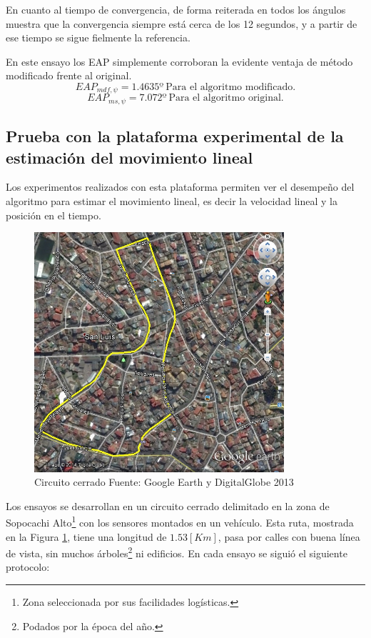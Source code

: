 \documentclass[conference]{IEEEtran}
\begin{document}
En cuanto al tiempo de convergencia, de forma reiterada en todos los ángulos muestra que la convergencia siempre está cerca de los 12 segundos, y a partir de ese tiempo se sigue fielmente la referencia.\par
En este ensayo los EAP simplemente corroboran la evidente ventaja de método modificado frente al original.
\begin{equation*}
EAP_{mdf,\psi}=1.4635º~\text{Para el algoritmo modificado.}
\end{equation*}
\begin{equation*}
EAP_{ms,\psi}=7.072º~\text{Para el algoritmo original.}
\end{equation*}\newpage
\subsection{Prueba con la plataforma experimental de la estimación del movimiento lineal}
Los experimentos realizados con esta plataforma permiten ver el desempeño del algoritmo para estimar el movimiento lineal, es decir la velocidad lineal y la posición en el tiempo. \par
\begin{figure}[ht]
\begin{center}
\includegraphics[width=25em]
{pruebas_fig1a.jpg}
\caption{Circuito cerrado \scriptsize{Fuente: Google Earth y DigitalGlobe 2013}}
\label{pruebas_fig1}
\end{center}
\end{figure}
Los ensayos se desarrollan en un circuito cerrado delimitado en la zona de Sopocachi Alto\footnote{Zona seleccionada por sus facilidades logísticas.} con los sensores montados en un vehículo. Esta ruta, mostrada en la Figura \ref{pruebas_fig1}, tiene una longitud de $1.53[Km]$, pasa por calles con buena línea de vista, sin muchos árboles\footnote{Podados por la época del año.} ni edificios. En cada ensayo se siguió el siguiente protocolo:	
\end{document}
